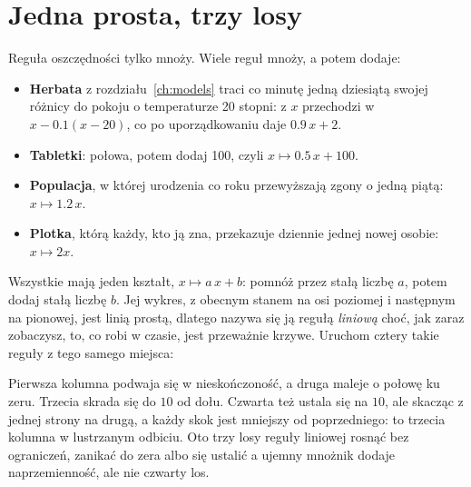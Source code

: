 \section{Jedna prosta, trzy losy}
\label{sec:ch02-fates}

\noindent
Reguła oszczędności tylko mnoży. Wiele reguł mnoży, a potem dodaje:

\begin{itemize}
\item \textbf{Herbata} z rozdziału~\ref{ch:models} traci co minutę jedną
  dziesiątą swojej różnicy do pokoju o temperaturze 20 stopni: z $x$
  przechodzi w $x - \num{0.1}(x - 20)$, co po uporządkowaniu daje
  $\num{0.9}\,x + 2$.
\item \textbf{Tabletki}: połowa, potem dodaj 100, czyli
  $x \mapsto \num{0.5}\,x + 100$.
\item \textbf{Populacja}, w której urodzenia co roku przewyższają zgony o
  jedną piątą: $x \mapsto \num{1.2}\,x$.
\item \textbf{Plotka}, którą każdy, kto ją zna, przekazuje dziennie jednej
  nowej osobie: $x \mapsto 2x$.
\end{itemize}

\noindent
Wszystkie mają jeden kształt, $x \mapsto a\,x + b$: pomnóż przez stałą
liczbę $a$, potem dodaj stałą liczbę $b$. Jej wykres, z obecnym stanem na
osi poziomej i następnym na pionowej, jest linią prostą, dlatego nazywa się
ją regułą \emph{liniową} \dash{} choć, jak zaraz zobaczysz, to, co robi w
czasie, jest przeważnie krzywe. Uruchom cztery takie reguły z tego samego
miejsca:



\noindent
Pierwsza kolumna podwaja się w nieskończoność, a druga maleje o połowę ku
zeru. Trzecia skrada się do $10$ od dołu. Czwarta też ustala się na $10$,
ale skacząc z jednej strony na drugą, a każdy skok jest mniejszy od
poprzedniego: to trzecia kolumna w lustrzanym odbiciu. Oto trzy losy reguły
liniowej \dash{} rosnąć bez ograniczeń, zanikać do zera albo się ustalić
\dash{} a ujemny mnożnik dodaje naprzemienność, ale nie czwarty los.


